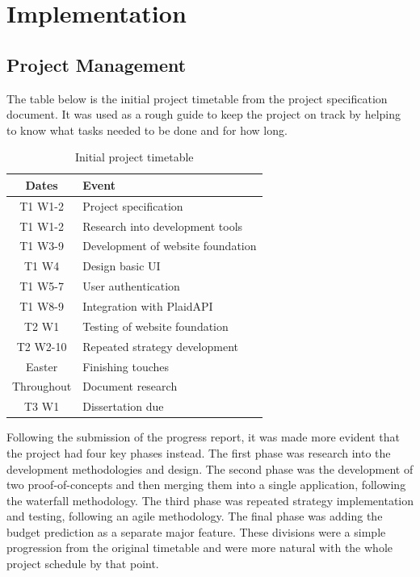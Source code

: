 \chapter{Implementation}
\label{ch:implementation}

\section{Project Management}
The table below is the initial project timetable from the project specification document. It was used as a rough guide to keep the project on track by helping to know what tasks needed to be done and for how long.

\begin{table}[H]
	\begin{center}
		\begin{tabular}{ | c | l | }
			\hline
			\textbf{Dates} & \textbf{Event}                    \\ \hline
			T1 W1-2        & Project specification             \\ \hline
			T1 W1-2        & Research into development tools   \\ \hline
			T1 W3-9        & Development of website foundation \\ \hline
			T1 W4          & Design basic UI                   \\ \hline
			T1 W5-7        & User authentication               \\ \hline
			T1 W8-9        & Integration with PlaidAPI         \\ \hline
			T2 W1          & Testing of website foundation     \\ \hline
			T2 W2-10       & Repeated strategy development     \\ \hline
			Easter         & Finishing touches                 \\ \hline
			Throughout     & Document research                 \\ \hline
			T3 W1          & Dissertation due                  \\ \hline
		\end{tabular}
	\end{center}
	\caption{Initial project timetable \cite{ProjectSpecification}}
\end{table}

Following the submission of the progress report, it was made more evident that the project had four key phases instead. The first phase was research into the development methodologies and design. The second phase was the development of two proof-of-concepts and then merging them into a single application, following the waterfall methodology. The third phase was repeated strategy implementation and testing, following an agile methodology. The final phase was adding the budget prediction as a separate major feature. These divisions were a simple progression from the original timetable and were more natural with the whole project schedule by that point.

